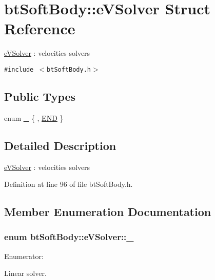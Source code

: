\hypertarget{structbt_soft_body_1_1e_v_solver}{
\section{btSoftBody::eVSolver Struct Reference}
\label{structbt_soft_body_1_1e_v_solver}
}
\hyperlink{structbt_soft_body_1_1e_v_solver}{eVSolver} : velocities solvers  


{\tt \#include $<$btSoftBody.h$>$}

\subsection*{Public Types}
\begin{CompactItemize}
\item 
enum \hyperlink{structbt_soft_body_1_1e_v_solver_d6a7083f91529d75cab91506cd63e088}{\_\-} \{ , \hyperlink{structbt_soft_body_1_1e_v_solver_d6a7083f91529d75cab91506cd63e088f9171d53f22882b6b27a94534ab72e01}{END}
 \}
\end{CompactItemize}


\subsection{Detailed Description}
\hyperlink{structbt_soft_body_1_1e_v_solver}{eVSolver} : velocities solvers 

Definition at line 96 of file btSoftBody.h.

\subsection{Member Enumeration Documentation}
\hypertarget{structbt_soft_body_1_1e_v_solver_d6a7083f91529d75cab91506cd63e088}{
\subsubsection[\_\-]{\setlength{\rightskip}{0pt plus 5cm}enum {\bf btSoftBody::eVSolver::\_\-}}}
\label{structbt_soft_body_1_1e_v_solver_d6a7083f91529d75cab91506cd63e088}


\begin{Desc}
\item[Enumerator: ]\par
\begin{description}
\item[{\em 
\hypertarget{structbt_soft_body_1_1e_v_solver_d6a7083f91529d75cab91506cd63e088f9171d53f22882b6b27a94534ab72e01}{
END}
\label{structbt_soft_body_1_1e_v_solver_d6a7083f91529d75cab91506cd63e088f9171d53f22882b6b27a94534ab72e01}
}]Linear solver. \end{description}
\end{Desc}



